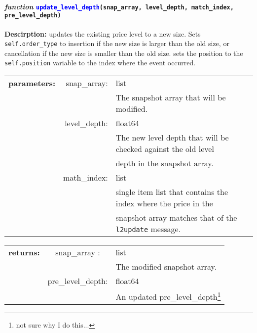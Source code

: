 \paragraph{\textit{function} \textcolor{blue}{\texttt{update\_level\_depth}}\texttt{(snap\_array, level\_depth, match\_index, pre\_level\_depth)}}
\hfill \break
\textbf{Descirption:} updates the existing price level to a new size. Sets \texttt{self.order\_type} to insertion if the new size is larger than the old size, or cancellation if the new size is smaller than the old size. sets the position to the \texttt{self.position} variable to the index where the event occurred.

\begin{tabular}{r r l }
	\textbf{parameters:}	& snap\_array: & list\\
	&  & The snapshot array that will be modified.\\
	& level\_depth:& float64\\
	&& The new level depth that will be checked against the old level \\
	&&  depth in the snapshot array.\\
	& math\_index:& list\\
	&& single item list that contains the index where the price in the\\
	&& snapshot array matches that of the \texttt{l2update} message. 
\end{tabular}

\begin{tabular}{l c l}
	\textbf{returns:} & snap\_array : & list\\
	&& The modified snapshot array.\\
	& pre\_level\_depth:& float64\\
	&& An updated pre\_level\_depth\footnote{not sure why I do this...}  
\end{tabular}

